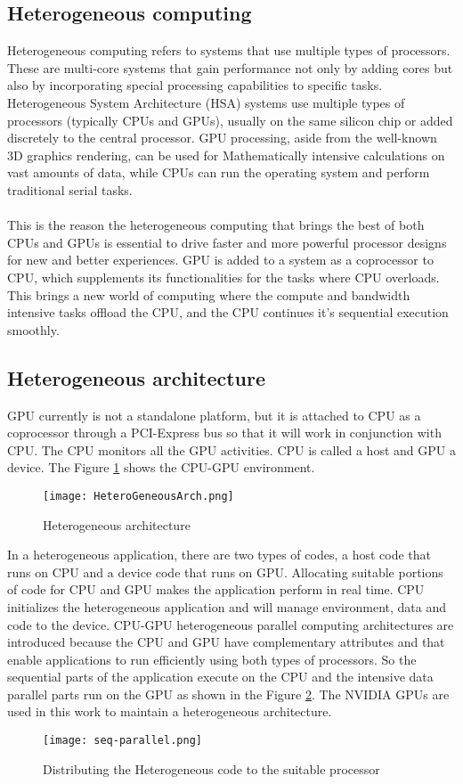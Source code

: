 \subsection{Heterogeneous computing}
Heterogeneous computing refers to systems that use multiple types of processors. These are multi-core systems that gain performance not only by adding cores but also by incorporating special processing capabilities to specific tasks. Heterogeneous System Architecture (HSA) systems use multiple types of processors (typically CPUs and GPUs), usually on the same silicon chip or added discretely to the central processor. GPU processing, aside from the well-known 3D graphics rendering, can be used for Mathematically intensive calculations on vast amounts of data, while CPUs can run the operating system and perform traditional serial tasks.\paragraph*{}This is the reason the heterogeneous computing that brings the best of both CPUs and GPUs is essential to drive faster and more powerful processor designs for new and better experiences. GPU is added to a system as a coprocessor to CPU, which supplements its functionalities for the tasks where CPU overloads. This brings a new world of computing where the compute and bandwidth intensive tasks offload the CPU, and the CPU continues it's sequential execution smoothly.
\subsection{Heterogeneous architecture}
GPU currently is not a standalone platform, but it is attached to CPU as a coprocessor through a PCI-Express bus so that it will work in conjunction with CPU. The CPU monitors all the GPU activities. CPU is called a host and GPU a device. The Figure \ref{Figure:1.1} shows the CPU-GPU environment.
\begin{figure}[h!]
  \centering
  \texttt{[image: HeteroGeneousArch.png]}
  \caption{Heterogeneous architecture}
  \label{Figure:1.1}
\end{figure}
In a heterogeneous application, there are two types of codes, a host code that runs on CPU and a device code that runs on GPU. Allocating suitable portions of code for CPU and GPU makes the application perform in real time. CPU initializes the heterogeneous application and will manage environment, data and code to the device. CPU-GPU heterogeneous parallel computing architectures are introduced because the CPU and GPU have complementary attributes and that enable applications to run efficiently using both types of processors. So the sequential parts of the application execute on the CPU and the intensive data parallel parts run on the GPU as shown in the Figure \ref{Figure 1.2}. The NVIDIA GPUs are used in this work to maintain a heterogeneous architecture.
\begin{figure}[h!]
  \centering
  \texttt{[image: seq-parallel.png]}
  \caption{Distributing the Heterogeneous code to the suitable processor}
  \label{Figure 1.2}
\end{figure}
